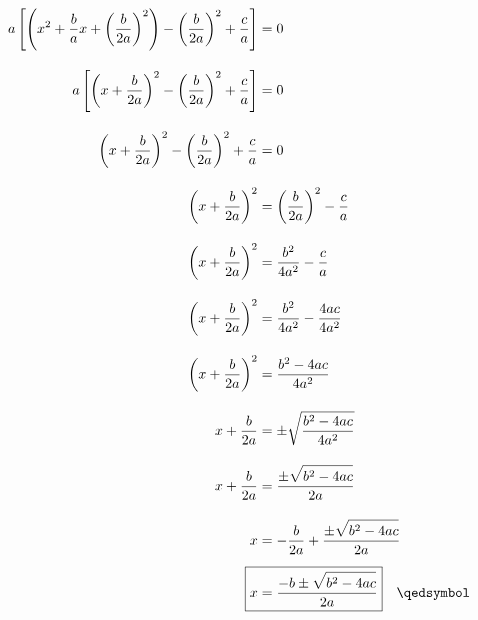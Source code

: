 \begin{minipage}{0.75\textwidth}
{
    \large
\begin{align*}
    a \left[ 
        \left(
            x^2 
            + \frac{b}{a}x    
            + \left( \frac{b}{2a} \right)^2 
        \right)
        - \left( \frac{b}{2a} \right)^2 
        +     \frac{c}{a} 
    \right] &= 0 
    \\[1em]
    a \left[ 
        \left(
            x + \frac{b}{2a}
        \right)^2
        - \left( \frac{b}{2a} \right)^2 
        +     \frac{c}{a} 
    \right] &= 0 
    \\[1em]
    \left(
        x + \frac{b}{2a}
    \right)^2
    - \left( \frac{b}{2a} \right)^2 
    +     \frac{c}{a} 
    &= 0 
    \\[1em]
    \left(
        x + \frac{b}{2a}
    \right)^2
    &=
     \left( \frac{b}{2a} \right)^2 
         - \frac{c}{a} 
         \\[1em]
    \left(
        x + \frac{b}{2a}
    \right)^2
    &=
     \frac{b^2}{4a^2} - \frac{c}{a} 
     \\[1em]
    \left(
        x + \frac{b}{2a}
    \right)^2
    &=
     \frac{b^2}{4a^2} - \frac{4ac}{4a^2} 
     \\[1em]
    \left(
        x + \frac{b}{2a}
    \right)^2
    &=
     \frac{b^2-4ac}{4a^2} 
     \\[1em]
    x + \frac{b}{2a}
    &=
    \pm \sqrt{   \frac{b^2-4ac}{4a^2}   }
    \\[1em]
    x + \frac{b}{2a}
    &=
    \frac{\pm\sqrt{ \rule{0pt}{2.3ex} b^2-4ac}}{2a}
    \\[1em]
    x 
    &=
    - 
    \frac{b}{2a}
    +
    \frac{\pm\sqrt{ \rule{0pt}{2.3ex} b^2-4ac}}{2a}
    \\[0.5em]
    \Aboxed{
        x &= \frac{-b\pm\sqrt{ \rule{0pt}{2.3ex} b^2-4ac}}{2a}
    }\quad\qedsymbol
\end{align*}
}
\end{minipage}
